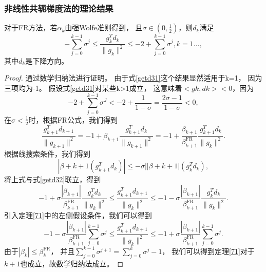 \subsubsection{非线性共轭梯度法的理论结果}
\begin{theorem}
    对于FR方法，若$\alpha_k$由强Wolfe准则得到，
    且$\sigma\in(0,\frac{1}{2})$，则$d_k$满足
    \begin{equation}
        -\displaystyle\sum^{k-1}_{j=0}\sigma^j \leq
        \displaystyle\frac{g_k^Td_k}{\|g_k\|^2}\leq
        -2 + \displaystyle\sum^{k-1}_{j=0}\sigma^j, k = 1...,
        \label{getd31}
    \end{equation}
    其中$d_k$是下降方向\cite{1992Global}。
    \label{71}
\end{theorem}
\begin{proof}   
    通过数学归纳法进行证明。
    由于式\ref{getd31}这个结果显然适用于k=1，
    因为三项均为-1。
    假设式\ref{getd31}对某些k>1成立，
    这意味着$<gk,dk><0$，因为
    \begin{equation*}
        -2 + \displaystyle\sum^{k-1}_{j=0}\sigma^J < 
        -2 + \frac{1}{1-\sigma} = 
        \frac{2\sigma-1}{1-\sigma} < 0,
    \end{equation*}
    在$\sigma < \frac{1}{2}$时，根据FR公式，我们得到
    \begin{equation*}\label{getd32}
        \displaystyle\frac{g_{k+1}^Td_{k+1}}{\|g_{k+1}\|^2} = 
        -1 + \beta_{k+1}\displaystyle\frac{g_{k+1}^Td_k}{\|g_{k+1}\|^2} = 
        -1 + \displaystyle\frac{\beta_{k+1}}{\beta_{k+1}^{\mathrm {FR}}}
        \displaystyle\frac{g_{k+1}^Td_k}{\|g_{k}\|^2}.
    \end{equation*}
    根据线搜索条件，我们得到
    \begin{equation*}
        |\beta+{k+1}(g_{k+1}^Td_k)| \leq -\sigma||\beta+{k+1}|(g_{k}^Td_k),
    \end{equation*}
    将上式与式\ref{getd32}联立，得到
    \begin{equation}
        -1 + \sigma \displaystyle\frac{|\beta_{k+1}|}{\beta_{k+1}^{\mathrm {FR}}}
        \displaystyle\frac{g_{k}^Td_k}{\|g_{k}\|^2}
        \leq
        \displaystyle\frac{g_{k+1}^Td_{k+1}}{\|g_{k}\|^2}
        \leq
        -1 - \sigma \displaystyle\frac{|\beta_{k+1}|}{\beta_{k+1}^{\mathrm {FR}}}
        \displaystyle\frac{g_{k}^Td_k}{\|g_{k}\|^2}.
    \nonumber
    \end{equation}
    引入定理\ref{71}中的左侧假设条件，我们可以得到
    \begin{equation}
        -1 - \sigma \displaystyle\frac{|\beta_{k+1}|}{\beta_{k+1}^{\mathrm {FR}}}
        \displaystyle\sum^{k-1}_{j=0}\sigma^j
        \leq
        \displaystyle\frac{g_{k+1}^Td_{k+1}}{\|g_{k}\|^2}
        \leq
        -1 + \sigma \displaystyle\frac{|\beta_{k+1}|}{\beta_{k+1}^{\mathrm {FR}}}
        \displaystyle\sum^{k-1}_{j=0}\sigma^j.
    \nonumber
    \end{equation}
    由于$|\beta_k| \leq \beta_k^{\mathrm {FR}}$，
    并且$\displaystyle\sum^{k-1}_{j=0}\sigma^{j+1} = \displaystyle\sum^{k}_{j=0}\sigma^{j} - 1 $，
    我们可以得到定理\ref{71}对于$k+1$也成立，故数学归纳法成立。
\end{proof}

